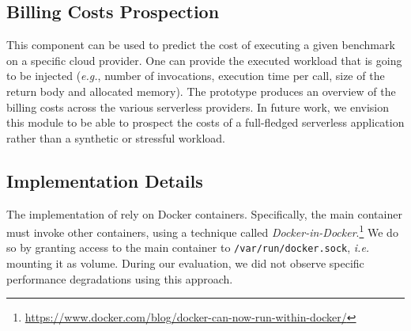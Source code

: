 \subsection{Billing Costs Prospection}
This component can be used to predict the cost of executing a given benchmark on a specific cloud provider.
One can provide the executed workload that is going to be injected (\emph{e.g.}, number of invocations, execution time per call, size of the return body and allocated memory).
The \sys prototype produces an overview of the billing costs across the various serverless providers.
In future work, we envision this module to be able to prospect the costs of a full-fledged serverless application rather than a synthetic or stressful workload.

\subsection{Implementation Details}\label{ssec:impl}
The implementation of \sys rely on Docker containers.
Specifically, the main container must invoke other containers, using a technique called \emph{Docker-in-Docker}.\footnote{\url{https://www.docker.com/blog/docker-can-now-run-within-docker/}}
We do so by granting access to the main container to \texttt{/var/run/docker.sock}, \emph{i.e.} mounting it as volume.
During our evaluation, we did not observe specific performance degradations using this approach.